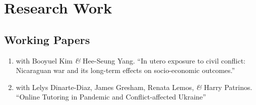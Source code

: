 \documentclass[a4paper, 10pt]{article}
\renewenvironment{itemize}{
  \begin{list}{}
    { \setlength{\itemsep}{5pt}
      \setlength{\parsep}{0pt}
      \setlength{\topsep}{0pt}
      \setlength{\leftmargin}{0em} } }{
  \end{list}}
\begin{document}





\section*{Research Work}

\subsection*{Working Papers}

\begin{enumerate}[leftmargin=10pt, label={}, itemindent=-10pt, nosep]
\item with Booyuel Kim \textit{\&} Hee-Seung Yang. ``In utero exposure to civil conflict: Nicaraguan war and its long-term effects on socio-economic outcomes.''
\item with Lelys Dinarte-Diaz, James Gresham, Renata Lemos, \textit{\&} Harry
Patrinos. ``Online Tutoring in Pandemic and Conflict-affected Ukraine''
\end{enumerate}
\end{document}
